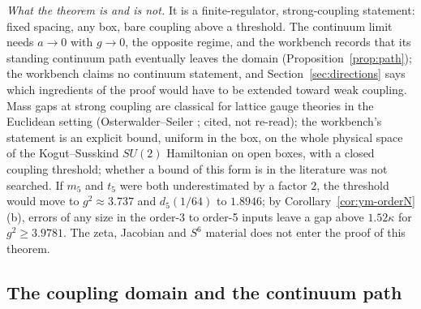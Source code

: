 \emph{What the theorem is and is not.} It is a finite-regulator, strong-coupling statement: fixed spacing, any box, bare coupling above a threshold. The continuum limit needs $a\to0$ with $g\to0$, the opposite regime, and the workbench records that its standing continuum path eventually leaves the domain (Proposition~\ref{prop:path}); the workbench claims no continuum statement, and Section~\ref{sec:directions} says which ingredients of the proof would have to be extended toward weak coupling. Mass gaps at strong coupling are classical for lattice gauge theories in the Euclidean setting (Osterwalder--Seiler \cite{OsterwalderSeiler}; cited, not re-read); the workbench's statement is an explicit bound, uniform in the box, on the whole physical space of the Kogut--Susskind $SU(2)$ Hamiltonian on open boxes, with a closed coupling threshold; whether a bound of this form is in the literature was not searched. If $m_5$ and $t_5$ were both underestimated by a factor $2$, the threshold would move to $g^2\approx3.737$ and $d_5(1/64)$ to $1.8946$; by Corollary~\ref{cor:ym-orderN}(b), errors of any size in the order-3 to order-5 inputs leave a gap above $1.52\kappa$ for $g^2\ge3.9781$. The zeta, Jacobian and $S^6$ material does not enter the proof of this theorem.


\subsection{The coupling domain and the continuum path}

